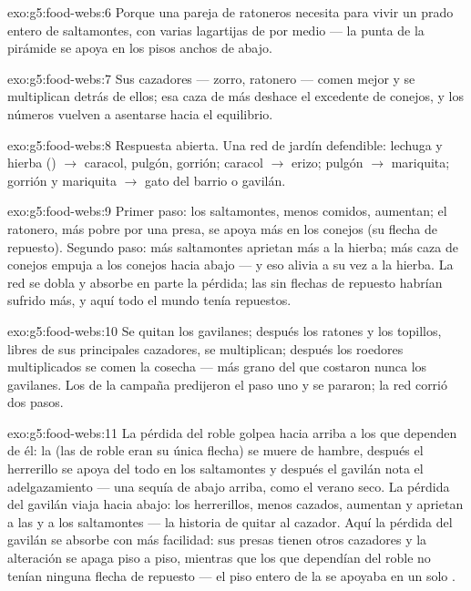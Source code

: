 \begin{solution}{exo:g5:food-webs:6}
Porque una pareja de ratoneros necesita para vivir un prado entero de
saltamontes, con varias lagartijas de por medio --- la punta de la
pirámide se apoya en los pisos anchos de abajo.
\end{solution}

\begin{solution}{exo:g5:food-webs:7}
Sus cazadores --- zorro, ratonero --- comen mejor y se multiplican
detrás de ellos; esa caza de más deshace el excedente de conejos, y
los números vuelven a asentarse hacia el equilibrio.
\end{solution}

\begin{solution}{exo:g5:food-webs:8}
Respuesta abierta. Una red de jardín defendible: lechuga y hierba
() $\rightarrow$ caracol, pulgón, gorrión; caracol
$\rightarrow$ erizo; pulgón $\rightarrow$ mariquita; gorrión y
mariquita $\rightarrow$ gato del barrio o gavilán.
\end{solution}

\begin{solution}{exo:g5:food-webs:9}
Primer paso: los saltamontes, menos comidos, aumentan; el ratonero,
más pobre por una presa, se apoya más en los conejos (su flecha de
repuesto). Segundo paso: más saltamontes aprietan más a la hierba; más
caza de conejos empuja a los conejos hacia abajo --- y eso alivia a su
vez a la hierba. La red se dobla y absorbe en parte la pérdida; las
 sin flechas de repuesto habrían sufrido más, y aquí todo el
mundo tenía repuestos.
\end{solution}

\begin{solution}{exo:g5:food-webs:10}
Se quitan los gavilanes; después los ratones y los topillos, libres de
sus principales cazadores, se multiplican; después los roedores
multiplicados se comen la cosecha --- más grano del que costaron nunca
los gavilanes. Los de la campaña predijeron el paso uno y se pararon;
la red corrió dos pasos.
\end{solution}

\begin{solution}{exo:g5:food-webs:11}
La pérdida del roble golpea hacia arriba a los que dependen de él: la
 (las  de roble eran su única flecha) se muere de hambre,
después el herrerillo se apoya del todo en los saltamontes y después
el gavilán nota el adelgazamiento --- una sequía de abajo arriba, como
el verano seco. La pérdida del gavilán viaja hacia abajo: los
herrerillos, menos cazados, aumentan y aprietan a las  y a los
saltamontes --- la historia de quitar al cazador. Aquí la pérdida del
gavilán se absorbe con más facilidad: sus presas tienen otros
cazadores y la alteración se apaga piso a piso, mientras que los que
dependían del roble no tenían ninguna flecha de repuesto --- el piso
entero de la  se apoyaba en un solo .
\end{solution}
